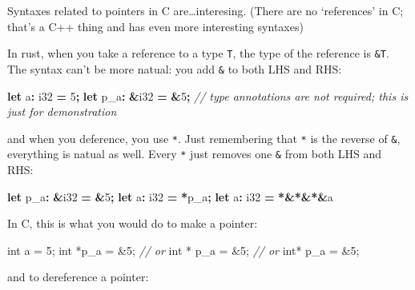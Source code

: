 \documentclass[
]{book}
\newenvironment{Shaded}{\begin{snugshade}}{\end{snugshade}}
\newcommand{\CommentTok}[1]{\textcolor[rgb]{0.56,0.35,0.01}{\textit{#1}}}
\newcommand{\DataTypeTok}[1]{\textcolor[rgb]{0.13,0.29,0.53}{#1}}
\newcommand{\DecValTok}[1]{\textcolor[rgb]{0.00,0.00,0.81}{#1}}
\newcommand{\KeywordTok}[1]{\textcolor[rgb]{0.13,0.29,0.53}{\textbf{#1}}}
\newcommand{\NormalTok}[1]{#1}
\newcommand{\OperatorTok}[1]{\textcolor[rgb]{0.81,0.36,0.00}{\textbf{#1}}}
\begin{document}
Syntaxes related to pointers in C are\ldots interesing. (There are no `references' in C; that's a C++ thing and has even more interesting syntaxes)

In rust, when you take a reference to a type \texttt{T}, the type of the reference is \texttt{\&T}. The syntax can't be more natual: you add \texttt{\&} to both LHS and RHS:

\begin{Shaded}
\begin{Highlighting}[]
\KeywordTok{let}\NormalTok{   a}\OperatorTok{:}  \DataTypeTok{i32} \OperatorTok{=}  \DecValTok{5}\OperatorTok{;}
\KeywordTok{let}\NormalTok{ p\_a}\OperatorTok{:} \OperatorTok{\&}\DataTypeTok{i32} \OperatorTok{=} \OperatorTok{\&}\DecValTok{5}\OperatorTok{;} \CommentTok{// type annotations are not required; this is just for demonstration}
\end{Highlighting}
\end{Shaded}

and when you deference, you use \texttt{*}. Just remembering that \texttt{*} is the reverse of \texttt{\&}, everything is natual as well. Every \texttt{*} just removes one \texttt{\&} from both LHS and RHS:

\begin{Shaded}
\begin{Highlighting}[]
\KeywordTok{let}\NormalTok{ p\_a}\OperatorTok{:} \OperatorTok{\&}\DataTypeTok{i32} \OperatorTok{=} \OperatorTok{\&}\DecValTok{5}\OperatorTok{;}
\KeywordTok{let}\NormalTok{   a}\OperatorTok{:}  \DataTypeTok{i32} \OperatorTok{=} \OperatorTok{*}\NormalTok{p\_a}\OperatorTok{;}
\KeywordTok{let}\NormalTok{   a}\OperatorTok{:}  \DataTypeTok{i32} \OperatorTok{=} \OperatorTok{*\&*\&*\&}\NormalTok{a}
\end{Highlighting}
\end{Shaded}

In C, this is what you would do to make a pointer:

\begin{Shaded}
\begin{Highlighting}[]
\DataTypeTok{int}\NormalTok{    a =  }\DecValTok{5}\NormalTok{;}
\DataTypeTok{int}\NormalTok{ *p\_a = \&}\DecValTok{5}\NormalTok{;}
\CommentTok{// or}
\DataTypeTok{int}\NormalTok{ * p\_a = \&}\DecValTok{5}\NormalTok{;}
\CommentTok{// or}
\DataTypeTok{int}\NormalTok{*  p\_a = \&}\DecValTok{5}\NormalTok{;}
\end{Highlighting}
\end{Shaded}

and to dereference a pointer:
\end{document}
